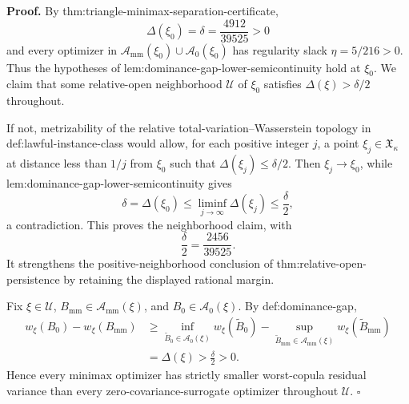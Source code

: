 \textbf{Proof.}
By thm:triangle-minimax-separation-certificate,
\[
 \Delta(\xi_0)=\delta=\frac{4912}{39525}>0
\]
and every optimizer in \(\mathcal A_{\mathrm{mm}}(\xi_0)\cup\mathcal A_0(\xi_0)\) has regularity slack \(\eta=5/216>0\).  Thus the hypotheses of lem:dominance-gap-lower-semicontinuity hold at \(\xi_0\).  We claim that some relative-open neighborhood \(\mathcal U\) of \(\xi_0\) satisfies \(\Delta(\xi)>\delta/2\) throughout.

If not, metrizability of the relative total-variation--Wasserstein topology in def:lawful-instance-class would allow, for each positive integer \(j\), a point \(\xi_j\in\mathfrak X_\kappa\) at distance less than \(1/j\) from \(\xi_0\) such that \(\Delta(\xi_j)\le\delta/2\).  Then \(\xi_j\to\xi_0\), while lem:dominance-gap-lower-semicontinuity gives
\[
 \delta=\Delta(\xi_0)
 \le\liminf_{j\to\infty}\Delta(\xi_j)
 \le\frac{\delta}{2},
\]
a contradiction.  This proves the neighborhood claim, with
\[
 \frac{\delta}{2}=\frac{2456}{39525}.
\]
It strengthens the positive-neighborhood conclusion of thm:relative-open-persistence by retaining the displayed rational margin.

Fix \(\xi\in\mathcal U\), \(B_{\mathrm{mm}}\in\mathcal A_{\mathrm{mm}}(\xi)\), and \(B_0\in\mathcal A_0(\xi)\).  By def:dominance-gap,
\[
 \begin{split}
 w_\xi(B_0)-w_\xi(B_{\mathrm{mm}})
 &\ge
 \inf_{\widetilde B_0\in\mathcal A_0(\xi)}w_\xi(\widetilde B_0)
 -\sup_{\widetilde B_{\mathrm{mm}}\in\mathcal A_{\mathrm{mm}}(\xi)}
 w_\xi(\widetilde B_{\mathrm{mm}})\\
 &=\Delta(\xi)>\frac{\delta}{2}>0.
 \end{split}
\]
Hence every minimax optimizer has strictly smaller worst-copula residual variance than every zero-covariance-surrogate optimizer throughout \(\mathcal U\). \(\square\)